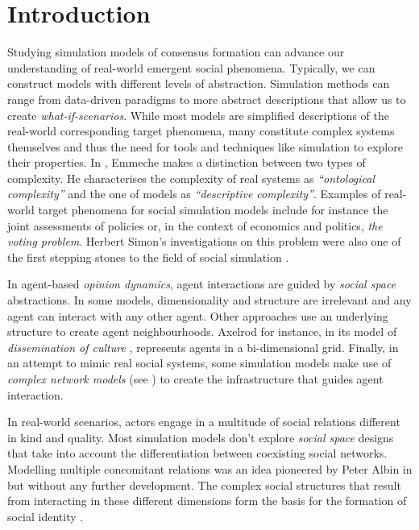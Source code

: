 \documentclass[preprint,number]{elsarticle}
\begin{document}
	\section{Introduction}
	\label{sec:introduction}
	Studying simulation models of consensus formation can advance our understanding of real-world emergent social phenomena. Typically, we can construct models with different levels of abstraction. Simulation methods can range from data-driven paradigms to more abstract descriptions that allow us to create \textit{what-if-scenarios}. While most models are simplified descriptions of the real-world corresponding target phenomena, many constitute complex systems themselves and thus the need for tools and techniques like simulation to explore their properties. In \cite{Emmeche1997}, Emmeche makes a distinction between two types of complexity. He characterises the complexity of real systems as \textit{``ontological complexity''} and the one of models as \textit{``descriptive complexity''}. Examples of real-world target phenomena for social simulation models include for instance the joint assessments of policies or, in the context of economics and politics, \textit{the voting problem}. Herbert Simon's investigations on this problem were also one of the first stepping stones to the field of social simulation \cite{Simon1954}.
	
	In agent-based \textit{opinion dynamics}, agent interactions are guided by \textit{social space} abstractions. In some models, dimensionality and structure are irrelevant and any agent can interact with any other agent.
	Other approaches use an underlying structure to create agent neighbourhoods. Axelrod for instance, in its model of \textit{dissemination of culture} \cite{Axelrod1997}, represents agents in a bi-dimensional grid. Finally, in an attempt to mimic real social systems, some simulation models make use of \textit{complex network models} (see \cite{Weisbuch2004}) to create the infrastructure that guides agent interaction.
	

	In real-world scenarios, actors engage in a multitude of social relations different in kind and quality. Most simulation models don't explore \textit{social space} designs that take into account the differentiation between coexisting social networks. Modelling multiple concomitant relations was an idea pioneered by Peter Albin in \cite{Albin1975} but without any further development. The complex social structures that result from interacting in these different dimensions form the basis for the formation of social identity \cite{Roccas2002,Ellemers2002}.
	
\end{document}
